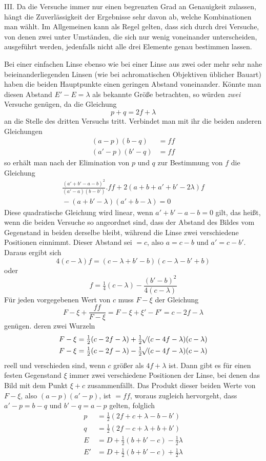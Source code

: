 III. Da die Versuche immer nur einen begrenzten Grad an Genauigkeit zulassen, hängt die Zuverlässigkeit der Ergebnisse sehr davon ab, welche Kombinationen man wählt. Im Allgemeinen kann als Regel gelten, dass sich durch drei Versuche, von denen zwei unter Umständen, die sich nur wenig voneinander unterscheiden, ausgeführt werden, jedenfalls nicht alle drei Elemente genau bestimmen lassen.

Bei einer einfachen Linse ebenso wie bei einer Linse aus zwei oder mehr sehr nahe beieinanderliegenden Linsen (wie bei achromatischen Objektiven üblicher Bauart) haben die beiden Hauptpunkte einen geringen Abstand voneinander. Könnte man diesen Abstand $E'-E=\lambda$ als bekannte Größe betrachten, so würden \textit{zwei} Versuche genügen, da die Gleichung
\[
p+q=2f+\lambda
\]
an die Stelle des dritten Versuchs tritt. Verbindet man mit ihr die beiden anderen Gleichungen
\[
\begin{aligned}
(a-p)(b-q)&=ff\\
(a'-p)(b'-q)&=ff
\end{aligned}
\]
so erhält man nach der Elimination von $p$ und $q$ zur Bestimmung von $f$ die Gleichung
\[
\begin{aligned}
\frac{(a'+b'-a-b)^2}{(a'-a)(b-b')}.ff+2(a+b+a'+b'-2\lambda)f\\
{}-(a+b'-\lambda)(a'+b-\lambda)=0
\end{aligned}
\]
Diese quadratische Gleichung wird linear, wenn $a'+b'-a-b=0$ gilt, das heißt, wenn die beiden Versuche so angeordnet sind, dass der Abstand des Bildes vom Gegenstand in beiden derselbe bleibt, während die Linse zwei verschiedene Positionen einnimmt. Dieser Abstand sei $=c$, also $a=c-b$ und $a'=c-b'$. Daraus ergibt sich
\[
4(c-\lambda)f=(c-\lambda+b'-b)(c-\lambda-b'+b)
\]
oder
\[
f=\tfrac14(c-\lambda)-\frac{(b'-b)^2}{4(c-\lambda)}
\]
Für jeden vorgegebenen Wert von $c$ muss $F-\xi$ der Gleichung
\[
F-\xi+\frac{ff}{F-\xi}=F-\xi+\xi'-F'=c-2f-\lambda
\]
genügen. deren zwei Wurzeln
\[
\begin{aligned}
F-\xi&=\tfrac12(c-2f-\lambda)+\tfrac12\mathord{{}^{}\!\surd}(c-4f-\lambda)(c-\lambda)\\
F-\xi&=\tfrac12(c-2f-\lambda)-\tfrac12\mathord{{}^{}\!\surd}(c-4f-\lambda)(c-\lambda)
\end{aligned}
\]
reell und verschieden sind, wenn $c$ größer als $4f+\lambda$ ist. Dann gibt es für einen festen Gegenstand $\xi$ immer zwei verschiedene Positionen der Linse, bei denen das Bild mit dem Punkt $\xi+c$ zusammenfällt. Das Produkt dieser beiden Werte von $F-\xi$, also $(a-p)(a'-p)$, ist $=ff$, woraus zugleich hervorgeht,
dass $a'-p=b-q$ und $b'-q=a-p$ gelten, folglich
\[
\begin{aligned}
p&=\tfrac12(2f+c+\lambda-b-b')\\
q&=\tfrac12(2f-c+\lambda+b+b')\\
E&=D+\tfrac12(b+b'-c)-\tfrac12\lambda\\
E'&=D+\tfrac12(b+b'-c)+\tfrac12\lambda
\end{aligned}
\]

